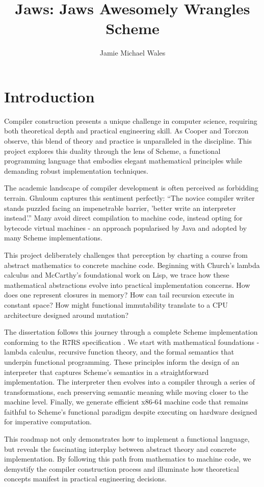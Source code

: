 \documentclass[final]{cmpreport_02}
\title{Jaws: Jaws Awesomely Wrangles Scheme}
\author{Jamie Michael Wales}
\begin{document}
\section{Introduction}

Compiler construction presents a unique challenge in computer science, requiring both theoretical depth and practical engineering skill. As Cooper and Torczon \cite{cooper2011engineering} observe, this blend of theory and practice is unparalleled in the discipline. This project explores this duality through the lens of Scheme, a functional programming language that embodies elegant mathematical principles while demanding robust implementation techniques.

The academic landscape of compiler development is often perceived as forbidding terrain. Ghuloum captures this sentiment perfectly: ``The novice compiler writer stands puzzled facing an impenetrable barrier, 'better write an interpreter instead'.'' Many avoid direct compilation to machine code, instead opting for bytecode virtual machines - an approach popularised by Java and adopted by many Scheme implementations.

This project deliberately challenges that perception by charting a course from abstract mathematics to concrete machine code. Beginning with Church's lambda calculus and McCarthy's foundational work on Lisp, we trace how these mathematical abstractions evolve into practical implementation concerns. How does one represent closures in memory? How can tail recursion execute in constant space? How might functional immutability translate to a CPU architecture designed around mutation?

The dissertation follows this journey through a complete Scheme implementation conforming to the R7RS specification \cite{r7rs}. We start with mathematical foundations - lambda calculus, recursive function theory, and the formal semantics that underpin functional programming. These principles inform the design of an interpreter that captures Scheme's semantics in a straightforward implementation. The interpreter then evolves into a compiler through a series of transformations, each preserving semantic meaning while moving closer to the machine level. Finally, we generate efficient x86-64 machine code that remains faithful to Scheme's functional paradigm despite executing on hardware designed for imperative computation.

This roadmap not only demonstrates how to implement a functional language, but reveals the fascinating interplay between abstract theory and concrete implementation. By following this path from mathematics to machine code, we demystify the compiler construction process and illuminate how theoretical concepts manifest in practical engineering decisions.
\end{document}
